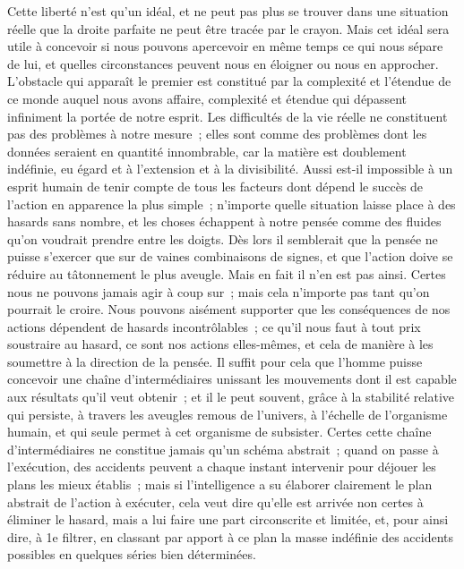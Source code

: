 \documentclass[french,twoside]{book} %
\begin{document}
Cette liberté n'est qu'un idéal, et ne peut pas plus se trouver dans une situation réelle que la droite parfaite ne peut être tracée par le crayon. Mais cet idéal sera utile à concevoir si nous pouvons apercevoir en même temps ce qui nous sépare de lui, et quelles circonstances peuvent nous en éloigner ou nous en approcher. L'obstacle qui apparaît le premier est constitué par la complexité et l'étendue de ce monde auquel nous avons affaire, complexité et étendue qui dépassent infiniment la portée de notre esprit. Les difficultés de la vie réelle ne constituent pas des problèmes à notre mesure ; elles sont comme des problèmes dont les données seraient en quantité innombrable, car la matière est doublement indéfinie, eu égard et à l'extension et à la divisibilité. Aussi est-il impossible à un esprit humain de tenir compte de tous les facteurs dont dépend le succès de l'action en apparence la plus simple ; n'importe quelle situation laisse place à des hasards sans nombre, et les choses échappent à notre pensée comme des fluides qu'on voudrait prendre entre les doigts. Dès lors il semblerait que la pensée ne puisse s'exercer que sur de vaines combinaisons de signes, et que l'action doive se réduire au tâtonnement le plus aveugle. Mais en fait il n'en est pas ainsi. Certes nous ne pouvons jamais agir à coup sur ; mais cela n'importe pas tant qu'on pourrait le croire. Nous pouvons aisément supporter que les conséquences de nos actions dépendent de hasards incontrôlables ; ce qu'il nous faut à tout prix soustraire au hasard, ce sont nos actions elles-mêmes, et cela de manière à les soumettre à la direction de la pensée. Il suffit pour cela que l'homme puisse concevoir une chaîne d'intermédiaires unissant les mouvements dont il est capable aux résultats qu'il veut obtenir ; et il le peut souvent, grâce à la stabilité relative qui persiste, à travers les aveugles remous de l'univers, à l'échelle de l'organisme humain, et qui seule permet à cet organisme de subsister. Certes cette chaîne d'intermédiaires ne constitue jamais qu'un schéma abstrait ; quand on passe à l'exécution, des accidents peuvent a chaque instant intervenir pour déjouer les plans les mieux établis ; mais si l'intelligence a su élaborer clairement le plan abstrait de l'action à exécuter, cela veut dire qu'elle est arrivée non certes à éliminer le hasard, mais a lui faire une part circonscrite et limitée, et, pour ainsi dire, à 1e filtrer, en classant par apport à ce plan la masse indéfinie des accidents possibles en quelques séries bien déterminées.\par
\end{document}
